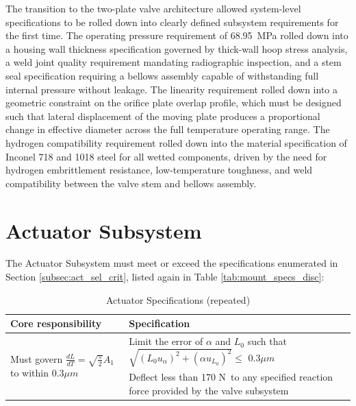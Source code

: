 \documentclass[12pt, letterpaper]{report}%
\newcounter{mycounter}           %
\newcounter{sub}[mycounter]      %
\newcommand{\specPressure}{68.95}%
\newcommand{\FTolValve}{170 N}
\newcommand{\dLdTTolAct}{$0.3 \mu m$}
\newcommand{\FTolAct}{\FTolValve}
\newcommand{\actSpecs}
{%
    \begin{tabular}{|m{0.45\textwidth}|m{0.5\textwidth}|}
    \hline
    \textbf{Core responsibility} & \textbf{Specification} \\ \hline

    \multirow[c]{2}{0.45\textwidth}{%
        Must govern $\frac{dL}{dT} = \sqrt{\frac{\pi}{2}} A_1$ to within \dLdTTolAct%
    }
    &
    Limit the error of $\alpha$ and $L_0$ such that 
        $\sqrt{ \left( L_0 u_{\alpha} \right) ^2 + \left( \alpha u_{L_0} \right) ^2} \leq$ \dLdTTolAct
    \\ \cline{2-2}
    &
    Deflect less than \FTolAct\ to any specified reaction force provided by the valve subsystem
    \\ \hline

    \end{tabular}

}
\begin{document}
                The transition to the two-plate valve architecture allowed system-level specifications to 
                be rolled down into clearly defined subsystem requirements for the first time. The 
                operating pressure requirement of \specPressure\ MPa rolled down into a housing wall thickness 
                specification governed by thick-wall hoop stress analysis, a weld joint quality requirement 
                mandating radiographic inspection, and a stem seal 
                specification requiring a bellows assembly capable of withstanding full internal pressure 
                without leakage. The linearity requirement rolled down into a geometric constraint on the 
                orifice plate overlap profile, which must be designed such that lateral displacement of 
                the moving plate produces a proportional change in effective diameter across the full 
                temperature operating range. The hydrogen 
                compatibility requirement rolled down into the material specification of Inconel 718  and 1018 steel for 
                all wetted components, driven by the need for hydrogen embrittlement resistance, 
                low-temperature toughness, and weld compatibility between the valve stem and bellows 
                assembly.
        
    \section{Actuator Subsystem}
        The Actuator Subsystem must meet or exceed the specifications enumerated in Section \ref{subsec:act_sel_crit}, listed again in Table \ref{tab:mount_specs_disc}:

        \begin{table}[H]
            \centering
            \caption{Actuator Specifications (repeated)}
            \actSpecs
            \label{tab:act_specs_disc}
            \renewcommand{\arraystretch}{1.4}
        \end{table}
\end{document}

